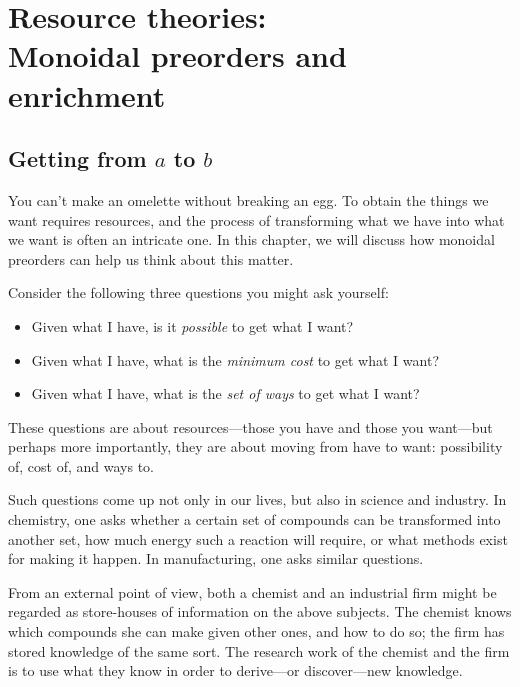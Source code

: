 \documentclass[7Sketches]{subfiles}
\begin{document}
\setcounter{chapter}{1}%
\chapter[Resources: monoidal preorders and enrichment]{Resource theories:\\Monoidal preorders and enrichment} %
\label{chap.resource_theory}


\section{Getting from $a$ to $b$}%

You can't make an omelette without breaking an egg. To obtain the things we want requires resources, and the process of transforming what we have into what we want is often an intricate one. In this chapter, we will discuss how monoidal preorders can help us think about this matter.

Consider the following three questions you might ask yourself:
\begin{itemize}
	\item Given what I have, is it \emph{possible} to get what I want?
	\item Given what I have, what is the \emph{minimum cost} to get what I want?
	\item Given what I have, what is the \emph{set of ways} to get what I want?
\end{itemize}
These questions are about resources---those you have and those you want---but perhaps more importantly, they are about moving from have to want: possibility of, cost of, and ways to.

Such questions come up not only in our lives, but also in science and industry. In chemistry, one asks whether a certain set of compounds can be transformed into another set, how much energy such a reaction will require, or what methods exist for making it happen. In manufacturing, one asks similar questions.
%
%

From an external point of view, both a chemist and an industrial firm might be regarded as store-houses of information on the above subjects. The chemist knows which compounds she can make given other ones, and how to do so; the firm has stored knowledge of the same sort. The research work of the chemist and the firm is to use what they know in order to derive---or discover---new knowledge.
\end{document}
